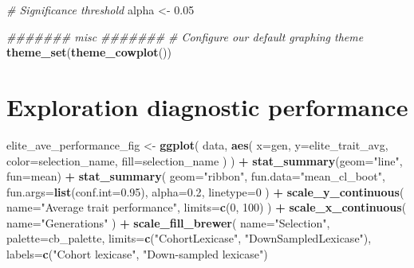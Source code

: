 \documentclass[]{book}
\newenvironment{Shaded}{\begin{snugshade}}{\end{snugshade}}
\newcommand{\CommentTok}[1]{\textcolor[rgb]{0.56,0.35,0.01}{\textit{#1}}}
\newcommand{\DataTypeTok}[1]{\textcolor[rgb]{0.13,0.29,0.53}{#1}}
\newcommand{\DecValTok}[1]{\textcolor[rgb]{0.00,0.00,0.81}{#1}}
\newcommand{\FloatTok}[1]{\textcolor[rgb]{0.00,0.00,0.81}{#1}}
\newcommand{\KeywordTok}[1]{\textcolor[rgb]{0.13,0.29,0.53}{\textbf{#1}}}
\newcommand{\NormalTok}[1]{#1}
\newcommand{\OperatorTok}[1]{\textcolor[rgb]{0.81,0.36,0.00}{\textbf{#1}}}
\newcommand{\StringTok}[1]{\textcolor[rgb]{0.31,0.60,0.02}{#1}}
\begin{document}
\begin{Shaded}
\begin{Highlighting}[]
\CommentTok{# Significance threshold}
\NormalTok{alpha <-}\StringTok{ }\FloatTok{0.05}

\CommentTok{####### misc #######}
\CommentTok{# Configure our default graphing theme}
\KeywordTok{theme_set}\NormalTok{(}\KeywordTok{theme_cowplot}\NormalTok{())}
\end{Highlighting}
\end{Shaded}

\hypertarget{exploration-diagnostic-performance-6}{%
\section{Exploration diagnostic performance}\label{exploration-diagnostic-performance-6}}

\begin{Shaded}
\begin{Highlighting}[]
\NormalTok{elite_ave_performance_fig <-}
\StringTok{  }\KeywordTok{ggplot}\NormalTok{(}
\NormalTok{    data,}
    \KeywordTok{aes}\NormalTok{(}
      \DataTypeTok{x=}\NormalTok{gen,}
      \DataTypeTok{y=}\NormalTok{elite_trait_avg,}
      \DataTypeTok{color=}\NormalTok{selection_name,}
      \DataTypeTok{fill=}\NormalTok{selection_name}
\NormalTok{    )}
\NormalTok{  ) }\OperatorTok{+}
\StringTok{  }\KeywordTok{stat_summary}\NormalTok{(}\DataTypeTok{geom=}\StringTok{"line"}\NormalTok{, }\DataTypeTok{fun=}\NormalTok{mean) }\OperatorTok{+}
\StringTok{  }\KeywordTok{stat_summary}\NormalTok{(}
    \DataTypeTok{geom=}\StringTok{"ribbon"}\NormalTok{,}
    \DataTypeTok{fun.data=}\StringTok{"mean_cl_boot"}\NormalTok{,}
    \DataTypeTok{fun.args=}\KeywordTok{list}\NormalTok{(}\DataTypeTok{conf.int=}\FloatTok{0.95}\NormalTok{),}
    \DataTypeTok{alpha=}\FloatTok{0.2}\NormalTok{,}
    \DataTypeTok{linetype=}\DecValTok{0}
\NormalTok{  ) }\OperatorTok{+}
\StringTok{  }\KeywordTok{scale_y_continuous}\NormalTok{(}
    \DataTypeTok{name=}\StringTok{"Average trait performance"}\NormalTok{,}
    \DataTypeTok{limits=}\KeywordTok{c}\NormalTok{(}\DecValTok{0}\NormalTok{, }\DecValTok{100}\NormalTok{)}
\NormalTok{  ) }\OperatorTok{+}
\StringTok{  }\KeywordTok{scale_x_continuous}\NormalTok{(}
    \DataTypeTok{name=}\StringTok{"Generations"}
\NormalTok{  ) }\OperatorTok{+}
\StringTok{  }\KeywordTok{scale_fill_brewer}\NormalTok{(}
    \DataTypeTok{name=}\StringTok{"Selection"}\NormalTok{,}
    \DataTypeTok{palette=}\NormalTok{cb_palette,}
    \DataTypeTok{limits=}\KeywordTok{c}\NormalTok{(}\StringTok{"CohortLexicase"}\NormalTok{, }\StringTok{"DownSampledLexicase"}\NormalTok{),}
    \DataTypeTok{labels=}\KeywordTok{c}\NormalTok{(}\StringTok{"Cohort lexicase"}\NormalTok{, }\StringTok{"Down-sampled lexicase"}\NormalTok{)}

\end{Highlighting}
\end{Shaded}
\end{document}

